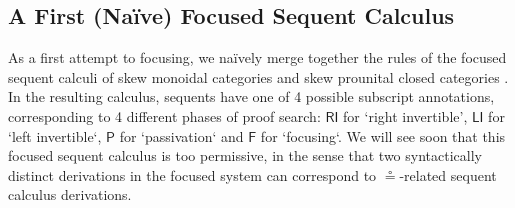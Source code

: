 \documentclass[copyright,creativecommons]{eptcs}
\theoremstyle{definition}
\newcommand{\RI}{\mathsf{RI}}
\newcommand{\LI}{\mathsf{LI}}
\newcommand{\Pass}{\mathsf{P}}
\newcommand{\F}{\mathsf{F}}
\begin{document}
\subsection{A First (Na{\"i}ve) Focused Sequent Calculus}
As a first attempt to focusing, we na{\"i}vely merge together the rules of the focused sequent calculi of skew monoidal categories \cite{uustalu:sequent:2021} and skew prounital closed categories \cite{uustalu:deductive:nodate}. In the resulting calculus, sequents have one of 4 possible subscript annotations, corresponding to 4 different phases of proof search: $\RI$ for `right invertible', $\LI$ for `left invertible`, $\Pass$ for `passivation` and $\F$ for `focusing`. We will see soon that this focused sequent calculus is too permissive, in the sense that two syntactically distinct derivations in the focused system can correspond to $\circeq$-related sequent calculus derivations.
\end{document}
